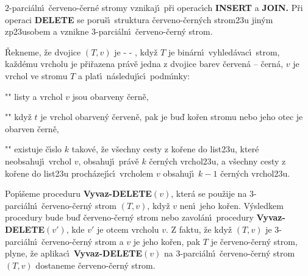 \documentclass[a4paper,12pt]{article}
\def \emph#1{\underbar{#1}}
\begin{document}
\midinsert
\centerline{}
\endcaption
\endinsert
\newpage

\midinsert
\centerline{}
\endcaption
\endinsert

\flushpar$2$-parci\'aln\'\i\ \v cerveno-\v cern\'e stromy vznikaj\'\i\ p\v ri 
operac\'\i ch {\bf INSERT} a {\bf JOIN.}  P\v ri operaci {\bf DELETE} se poru\v s\'\i\ 
struktura \v cerveno-\v cern\'ych strom\accent23u jin\'ym 
zp\accent23usobem a vznikne 3-parci\'aln\'\i\ \v cerveno-\v cer\-n\'y strom.  
\medskip

\flushpar\v Rekneme, \v ze dvojice $(T,v)$ je \emph{3}-\emph{parci\'aln\'\i} 
\emph{\v cerveno}-\emph{\v cern\'y} \emph{strom}, kdy\v z $T$ je bin\'arn\'\i\ 
vy\-hled\'avac\'\i\ strom, ka\v zd\'emu vrcholu je p\v ri\-\v razena pr\'av\v e jedna z 
dvojice barev \v cerven\'a -- \v cern\'a, $v$ je vrchol ve stromu $
T$ a 
plat\'\i\ n\'asleduj\'\i c\'\i\ podm\'\i nky: 
\roster
\item"{}"
listy a vrchol $v$ jsou obarveny \v cern\v e,
\item"{}"
kdy\v z $t$ je vrchol obarven\'y \v cerven\v e, pak je bu\v d ko\v ren 
stromu nebo jeho otec je obarven \v cern\v e,
\item"{}"
existuje \v c\'\i slo $k$ takov\'e, \v ze v\v sechny cesty z ko\v rene do 
list\accent23u, kter\'e neobsahuj\'\i\ vrchol $v$, obsahuj\'\i\ pr\'av\v e 
$k$ \v cer\-n\'ych vrchol\accent23u, a v\v sechny cesty z ko\v rene do 
list\accent23u proch\'a\-ze\-j\'\i\-c\'\i\ vrcholem $v$ obsahuj\'\i\ $
k-1$ \v cern\'ych 
vrchol\accent23u.
\endroster
\medskip

\flushpar Pop\'\i\v seme proceduru {\bf Vyvaz-DELETE$(v)$}, kter\'a se 
pou\v zije na 3-parci\'aln\'\i\ \v cerveno-\v cern\'y strom $(T,v)$, kdy\v z $
v$ nen\'\i\ jeho 
ko\v ren.  V\'ysledkem procedury bude bu\v d \v cerveno-\v cern\'y strom 
nebo zavol\'an\'\i\ procedury {\bf Vyvaz-DELE\-TE$(v')$}, kde $v'$ je otcem 
vrcholu $v$.  Z faktu, \v ze kdy\v z $(T,v)$ je 3-parci\'aln\'\i\ \v cerveno-\v cern\'y 
strom a $v$ je jeho ko\v ren, pak $T$ je \v cerveno-\v cern\'y strom, plyne, 
\v ze aplikac\'\i\ {\bf Vyvaz-DELETE$(v)$} na 3-parci\'aln\'\i\ \v cerveno-\v cern\'y strom 
$(T,v)$ dostaneme \v cerveno-\v cern\'y strom.  
\medskip
\end{document}

